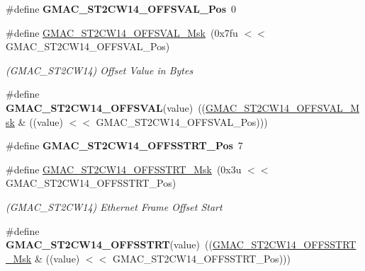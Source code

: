 \begin{DoxyCompactItemize}
\item 
\mbox{\label{group__SAME70__GMAC_ga5f4a301e7a019811028dfa4078930595}} 
\#define {\bfseries G\+M\+A\+C\+\_\+\+S\+T2\+C\+W14\+\_\+\+O\+F\+F\+S\+V\+A\+L\+\_\+\+Pos}~0
\item 
\mbox{\label{group__SAME70__GMAC_ga8266494cf10d0b97cd2948761a8a4962}} 
\#define \mbox{\hyperlink{group__SAME70__GMAC_ga8266494cf10d0b97cd2948761a8a4962}{G\+M\+A\+C\+\_\+\+S\+T2\+C\+W14\+\_\+\+O\+F\+F\+S\+V\+A\+L\+\_\+\+Msk}}~(0x7fu $<$$<$ G\+M\+A\+C\+\_\+\+S\+T2\+C\+W14\+\_\+\+O\+F\+F\+S\+V\+A\+L\+\_\+\+Pos)
\begin{DoxyCompactList}\small\item\em (G\+M\+A\+C\+\_\+\+S\+T2\+C\+W14) Offset Value in Bytes \end{DoxyCompactList}\item 
\mbox{\label{group__SAME70__GMAC_gacce1a148f84966dca5275a0008040c4c}} 
\#define {\bfseries G\+M\+A\+C\+\_\+\+S\+T2\+C\+W14\+\_\+\+O\+F\+F\+S\+V\+AL}(value)~((\mbox{\hyperlink{group__SAMV71__GMAC_ga8266494cf10d0b97cd2948761a8a4962}{G\+M\+A\+C\+\_\+\+S\+T2\+C\+W14\+\_\+\+O\+F\+F\+S\+V\+A\+L\+\_\+\+Msk}} \& ((value) $<$$<$ G\+M\+A\+C\+\_\+\+S\+T2\+C\+W14\+\_\+\+O\+F\+F\+S\+V\+A\+L\+\_\+\+Pos)))
\item 
\mbox{\label{group__SAME70__GMAC_ga6a7f245b0bf2c2da4e99ffa02fd66655}} 
\#define {\bfseries G\+M\+A\+C\+\_\+\+S\+T2\+C\+W14\+\_\+\+O\+F\+F\+S\+S\+T\+R\+T\+\_\+\+Pos}~7
\item 
\mbox{\label{group__SAME70__GMAC_ga7667912deb8761981013e0e703f09243}} 
\#define \mbox{\hyperlink{group__SAME70__GMAC_ga7667912deb8761981013e0e703f09243}{G\+M\+A\+C\+\_\+\+S\+T2\+C\+W14\+\_\+\+O\+F\+F\+S\+S\+T\+R\+T\+\_\+\+Msk}}~(0x3u $<$$<$ G\+M\+A\+C\+\_\+\+S\+T2\+C\+W14\+\_\+\+O\+F\+F\+S\+S\+T\+R\+T\+\_\+\+Pos)
\begin{DoxyCompactList}\small\item\em (G\+M\+A\+C\+\_\+\+S\+T2\+C\+W14) Ethernet Frame Offset Start \end{DoxyCompactList}\item 
\mbox{\label{group__SAME70__GMAC_ga4104d47c601f627816fa24b3a116f357}} 
\#define {\bfseries G\+M\+A\+C\+\_\+\+S\+T2\+C\+W14\+\_\+\+O\+F\+F\+S\+S\+T\+RT}(value)~((\mbox{\hyperlink{group__SAMV71__GMAC_ga7667912deb8761981013e0e703f09243}{G\+M\+A\+C\+\_\+\+S\+T2\+C\+W14\+\_\+\+O\+F\+F\+S\+S\+T\+R\+T\+\_\+\+Msk}} \& ((value) $<$$<$ G\+M\+A\+C\+\_\+\+S\+T2\+C\+W14\+\_\+\+O\+F\+F\+S\+S\+T\+R\+T\+\_\+\+Pos)))

\end{DoxyCompactItemize}
